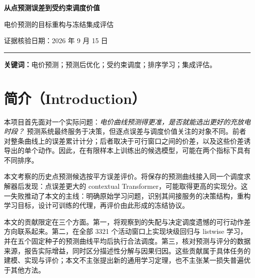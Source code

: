 \documentclass[11pt,a4paper]{article}
\begin{document}
\begin{center}
{\LARGE\bfseries\color{ink} 从点预测误差到受约束调度价值}\par\vspace{7pt}
{\large 电价预测的目标重构与冻结集成评估}\par\vspace{10pt}
\par
{\small 证据核验日期：2026 年 9 月 15 日}
\end{center}
\vspace{3pt}\noindent\textcolor{accent}{\rule{\linewidth}{0.8pt}}
\begin{abstract}
本项目的电价预测服务于一个受约束的日内调度任务：选择连续八格充电、随后连续八格放电，或者全天空闲。研究从原始评价逻辑的失败出发：在保存的候选模型中，更低的点预测 RMSE 未能稳定对应更高的实现调度价值。本文通过可行动作的几何结构解释这一失配，将学习目标重构为最大化预测器所诱导动作的实际价值，并以日中心块和回归、窗口 listwise 损失及冻结五种子曲线平均实现。指定 59 日评价期内，协议日均实现分为 \textbf{6693.88}，相对历史 MSE Transformer 参考的 \textbf{6214.36}，取得 \textbf{479.51（7.72\%）} 的观测提升。窗口排序一致性与实现分的描述性关联强于点误差，但训练代理损失本身未呈现稳定关联。收益增量也较集中：总净增益的 86.0\% 来自一天，配对七日块重采样区间为 $[-227.87,1626.28]$；同期主方案的最差单日实现分也低于参考。本文的贡献是可追溯的失败分析、目标重构与实现，以及一个取得正向结果的冻结协议；跨时期改善和损失函数的独立因果贡献仍需验证。
\end{abstract}
\noindent\textbf{关键词：}电价预测；预测后优化；受约束调度；排序学习；集成评估。

\section{简介（Introduction）}
本项目首先面对一个实际问题：\emph{电价曲线预测得更准，是否就能选出更好的充放电时段？} 预测系统最终服务于决策，但逐点误差与调度价值关注的对象不同。前者对整条曲线上的误差累计计分；后者取决于可行窗口之间的价差，以及这些价差诱导出的单个动作。因此，在有限样本上训练出的候选模型，可能在两个指标下具有不同排序。

本文考察的历史点预测候选按平方误差评价。将保存的预测曲线接入同一个调度求解器后发现：点误差更大的 contextual Transformer，可能取得更高的实现分。这一失败推动了本文的主线：明确原始学习问题，识别其间接服务的决策结构，重构学习目标，设计可训练的代理，再评价由此形成的冻结协议。

本文的贡献限定在三个方面。第一，将观察到的失配与决定调度遗憾的可行动作差方向联系起来。第二，在全部 3321 个活动窗口上实现块级回归与 listwise 学习，并在五个固定种子的预测曲线平均后执行合法调度。第三，核对预测与评分的数据来源，报告实际增益，同时区分描述性分解与因果归因。这些贡献属于具体任务的建模、实现与评价；本文不主张提出新的通用学习定理，也不主张某一损失普遍优于其他方法。
\end{document}
